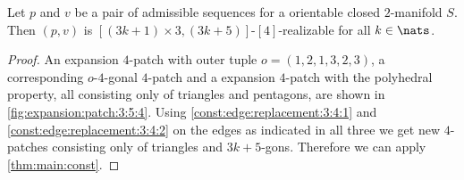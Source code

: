 \clearpage
\begin{theorem}
  Let $p$ and $v$ be a pair of admissible sequences for a orientable closed $2$-manifold $S$. Then $(p, v)$ is $[(3k + 1) \times 3, (3k+5)]$-$[4]$-realizable for all $k \in \nats$.
  \begin{proof}
    An expansion $4$-patch with outer tuple $o = (1, 2, 1, 3, 2, 3)$, a corresponding $o$-$4$-gonal $4$-patch and a expansion $4$-patch with the polyhedral property, all consisting only of triangles and pentagons, are shown in \autoref{fig:expansion:patch:3:5:4}. Using \autoref{const:edge:replacement:3:4:1} and \autoref{const:edge:replacement:3:4:2} on the edges as indicated in all three we get new $4$-patches consisting only of triangles and $3k + 5$-gons. Therefore we can apply \autoref{thm:main:const}.
  \end{proof}
\end{theorem}
